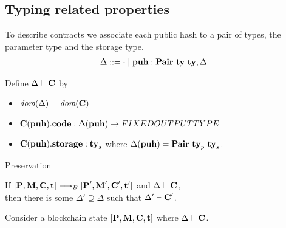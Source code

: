 \documentclass[a4paper]{llncs}
\begin{document}
\subsection{Typing related properties}

To describe contracts we associate each public hash to a pair of
types, the parameter type and the storage type.
\begin{align*}
  \Delta & ::= \cdot \mid \textbf{puh}: \textbf{Pair}\ \textbf{ty}\ \textbf{ty}, \Delta
\end{align*}

Define $ \Delta \vdash \textbf{C}$ by
\begin{itemize}
\item $\textit{dom} (\Delta) = \textit{dom} (\textbf{C})$
\item $\textbf{C} (\textbf{puh}).\textbf{code} : \Delta (\textbf{puh}) \to FIXEDOUTPUTTYPE$
\item $\textbf{C} (\textbf{puh}).\textbf{storage} : \textbf{ty}_s$ where $\Delta (\textbf{puh}) =
  \textbf{Pair}\ \textbf{ty}_p\ \textbf{ty}_s$. 
\end{itemize}

Preservation

If $[\textbf{P}, \textbf{M}, \textbf{C}, \textbf{t}] \stackrel{{}}\longrightarrow_B{}
[\textbf{P}', \textbf{M}', \textbf{C}', \textbf{t}']$
and $\Delta \vdash \textbf{C}$, \\
then
there is some $\Delta' \supseteq \Delta$ such that $\Delta' \vdash
\textbf{C}'$. 

Consider a blockchain state  $[\textbf{P}, \textbf{M}, \textbf{C},
\textbf{t}]$ where $\Delta \vdash \textbf{C}$.
\end{document}
